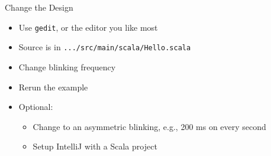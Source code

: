\documentclass[xcolor=pdflatex,dvipsnames,table]{beamer}
\newcommand{\code}[1]{{\texttt{#1}}}
\begin{document}
\begin{frame}[fragile]{Change the Design}
\begin{itemize}
\item Use \code{gedit}, or the editor you like most
\item Source is in \code{.../src/main/scala/Hello.scala}
\item Change blinking frequency
\item Rerun the example
\item Optional:
\begin{itemize}
\item Change to an asymmetric blinking, e.g., 200 ms on every second 
\item Setup IntelliJ with a Scala project 
\end{itemize}
\end{itemize}
\end{frame}
\end{document}
